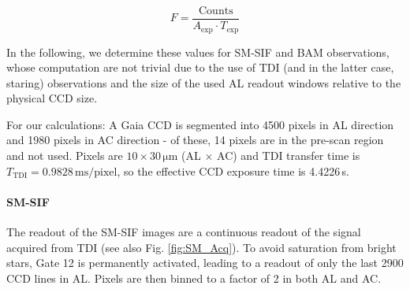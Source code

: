 \documentclass[a4paper, 11pt]{article}
\begin{document}
\begin{equation*}
  F = \frac{\mathrm{Counts}}{A_\mathrm{exp} \cdot T_\mathrm{exp}}
\end{equation*}

In the following, we determine these values for SM-SIF and BAM observations, whose computation are not trivial due to the use of TDI (and in the latter case, staring) observations and the size of the used AL readout windows relative to the physical CCD size.

For our calculations: A Gaia CCD is segmented into 4500 pixels in AL direction and 1980 pixels in AC direction - of these, 14 pixels are in the pre-scan region and not used. Pixels are $10 \times 30\, \mathrm{\mu m}$ (AL $\times$ AC) and TDI transfer time is $T_\mathrm{TDI} = 0.9828\, \mathrm{ms/pixel}$, so the effective CCD exposure time is 4.4226\,s.

\paragraph{SM-SIF \\}

The readout of the SM-SIF images are a continuous readout of the signal acquired from TDI (see also Fig. \ref{fig:SM_Acq}). To avoid saturation from bright stars, Gate 12 is permanently activated, leading to a readout of only the last 2900 CCD lines in AL. Pixels are then binned to a factor of 2 in both AL and AC.
\end{document}
